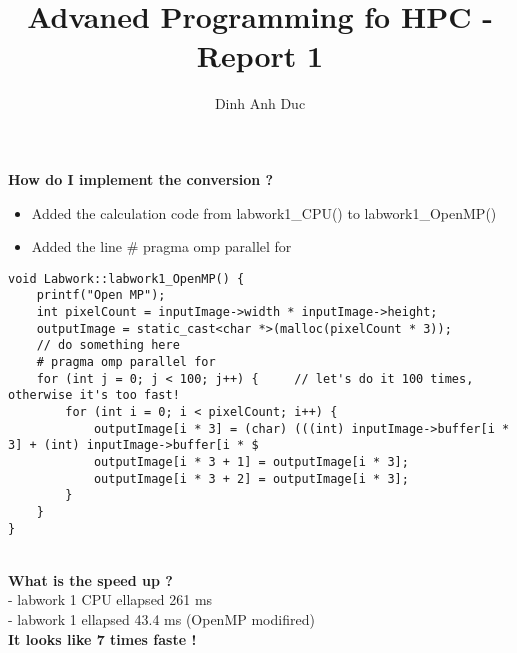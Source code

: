 \documentclass[10pt, a4paper]{article}
\title{Advaned Programming fo HPC - Report 1}
\author{Dinh Anh Duc}
\begin{document}
\maketitle

\textbf{How do I implement the conversion ?}
\\
\begin{itemize}
\item Added the calculation code from labwork1_CPU() to labwork1_OpenMP()
\item Added the line # pragma omp parallel for 
\end{itemize}
\begin{verbatim}
void Labwork::labwork1_OpenMP() {
    printf("Open MP");
    int pixelCount = inputImage->width * inputImage->height;
    outputImage = static_cast<char *>(malloc(pixelCount * 3));
    // do something here
    # pragma omp parallel for
    for (int j = 0; j < 100; j++) {     // let's do it 100 times, otherwise it's too fast!
        for (int i = 0; i < pixelCount; i++) {
            outputImage[i * 3] = (char) (((int) inputImage->buffer[i * 3] + (int) inputImage->buffer[i * $
            outputImage[i * 3 + 1] = outputImage[i * 3];
            outputImage[i * 3 + 2] = outputImage[i * 3];
        }
    }
}
\end{verbatim}
\\
\textbf{What is the speed up ?}
\\
- labwork 1 CPU ellapsed 261 ms
\\
- labwork 1 ellapsed 43.4 ms (OpenMP modifired)
\\
\textbf{It looks like 7 times faste !} 
\end{document}
